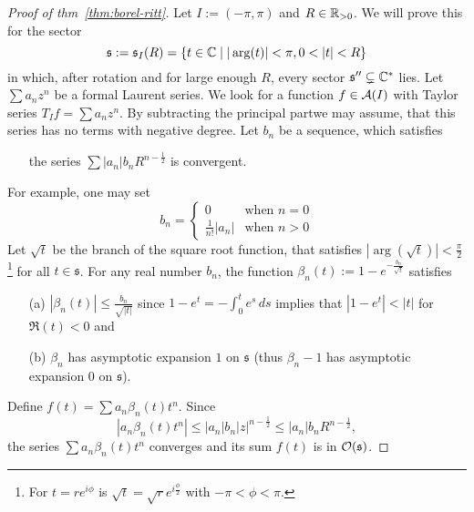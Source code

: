 \begin{proof}[Proof of thm~\ref{thm:borel-ritt}]
  Let $I:=(-\pi,\pi)$ and $R\in\mathbb{R}_{>0}$.
  We will prove this for the sector
  \[
    \mathfrak{s}:=\mathfrak{s}_{I}(R)=\left\{
      t\in\C\mid |\arg(t)|<\pi, 0<|t|<R
    \right\}
  \]
  in which, after rotation and for large enough $R$, every sector
  $\mathfrak{s}''\subsetneq\mathbb{C}^*$ lies.
  Let $\sum a_nz^n$ be a formal Laurent series. We look for a function
  $f\in\mathcal{A}(I)$ with Taylor series $T_{I}f=\sum a_nz^n$.
  By subtracting the principal part\TODO[?] we may assume, that this series has
  no terms with negative degree.
  Let $b_n$ be a sequence, which satisfies
  \begin{itemize}
    \item[] the series $\sum |a_n|b_nR^{n-\frac{1}{2}}$ is convergent.
  \end{itemize}
  For example\TODO[realy?], one may set
  \[
    b_n=\begin{cases}
      0                 & \text{when~} n=0
      \\\frac{1}{n!}|a_n| & \text{when~} n>0
    \end{cases}
  \]
  Let $\sqrt{t}$ be the branch of the square root function, that satisfies
  $|\arg(\sqrt{t})|<\frac{\pi}{2}$\footnote{For $t=re^{i\phi}$ is
  $\sqrt{t}=\sqrt{r}e^{i\frac{\phi}{2}}$ with $-\pi<\phi<\pi$.} for all
  $t\in\mathfrak{s}$.
  For any real number $b_n$, the function
  $\beta_n(t):=1-e^{-\frac{b_n}{\sqrt{t}}}$ satisfies
  \begin{enumerate}
    \item[(a)] $|\beta_n(t)|\leq\frac{b_n}{\sqrt{|t|}}$ since
      $1-e^t=-\int_0^te^s\,ds$ implies that $|1-e^t|<|t|$ for $\Re(t)<0$ and
    \item[(b)] $\beta_n$ has asymptotic expansion $1$ on $\mathfrak{s}$ (thus
      $\beta_n-1$ has asymptotic expansion $0$ on $\mathfrak{s}$).
  \end{enumerate}
  Define $f(t)=\sum a_n\beta_n(t)t^n$.
  Since 
  \[
    |a_n\beta_n(t)t^n|
    \leq|a_n|b_n|z|^{n-\frac{1}{2}}
    \leq|a_n|b_nR^{n-\frac{1}{2}},
  \]
  the series
  $\sum a_n\beta_n(t)t^n$ converges and its sum $f(t)$ is in
  $\mathcal{O}(\mathfrak{s})$.


\end{proof}
